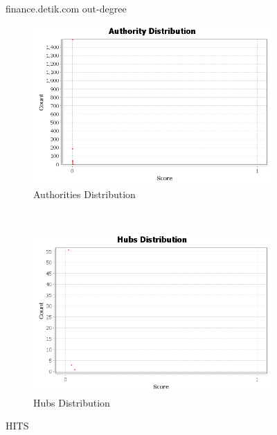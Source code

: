 \documentclass[a4paper,12pt]{article}
\begin{document}
\begin{figure}
\begin{subfigure}[b]{0.8\textwidth}
        \end{subfigure}%
        \caption{finance.detik.com out-degree}
\end{figure}

\begin{figure}
        \centering
        \begin{subfigure}[a]{1\textwidth}
                \includegraphics[width=\textwidth]{authorities.png}
                \caption{Authorities Distribution}
               
        \end{subfigure}
        ~ %
        
        \begin{subfigure}[b]{1\textwidth}
                \includegraphics[width=\textwidth]{hubs.png}
                \caption{Hubs Distribution}
                
        \end{subfigure}%
        \caption{HITS}
\end{figure}
\end{document}
